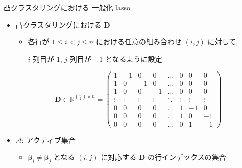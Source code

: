 \documentclass[dvipdfmx, 10pt]{beamer}
\begin{document}
\begin{frame}{凸クラスタリングにおける 一般化 lasso}

    \begin{itemize}
        \item 凸クラスタリングにおける $\bm{D}$
        \begin{itemize}
            \item 各行が $1 \le i < j \le n$ における任意の組み合わせ $(i, j)$ に対して, 
            
            $i$ 列目が $1$, $j$ 列目が $-1$ となるように設定
        \end{itemize}
        \[
            \bm{D} \in \mathbb{R}^{\binom{n}{2} \times n} = \left(
                \begin{array}{cccccccc}
                1 & -1 & 0 & 0 & \ldots & 0 & 0 & 0\\
                1 & 0 & -1 & 0 & \ldots & 0 & 0 & 0\\
                1 & 0 & 0 & -1 & \ldots & 0 & 0 & 0\\
                \vdots & \vdots & \vdots & \vdots & \ddots & \vdots & \vdots & \vdots\\
                0 & 0 & 0 & 0 & \ldots & 1 & -1 & 0\\
                0 & 0 & 0 & 0 & \ldots & 1 & 0 & -1\\
                0 & 0 & 0 & 0 & \ldots & 0 & 1 & -1
                \end{array}
            \right)
        \]
        \item $\mathcal{A}$: アクティブ集合
        \begin{itemize}
            \item $\bm{\beta}_{i} \neq \bm{\beta}_{j}$ となる $(i, j)$ に対応する $\bm{D}$ の行インデックスの集合
        \end{itemize}

    \end{itemize}
    
\end{frame}
\end{document}
